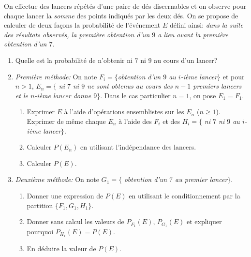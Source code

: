 \documentclass[a4paper,12pt,reqno]{amsart}
\begin{document}
\begin{exo}

  On effectue des lancers répétés d'une paire de dés discernables et on observe pour
  chaque lancer la \emph{somme} des points indiqués par les deux dés. On se
  propose de calculer de deux façons la probabilité de l'événement $E$ défini
  ainsi: \emph{dans la suite des résultats observés, la première obtention d'un
  $9$ a lieu avant la première obtention d'un $7$.}

  \begin{enumerate}
    \item  Quelle est la probabilité de n'obtenir ni $7$ ni $9$ au cours d'un lancer?
    \item \emph{Première méthode:} On note $F_i=\{$\emph{obtention d'un $9$ au $i$-ième lancer}$\}$ et pour $n>1$, $E_n=\{$ \emph{ni $7$ ni $9$ ne sont obtenus au cours des $n-1$ premiers lancers et le $n$-ième lancer donne $9$}$\}$. Dans le cas particulier $n=1$, on pose $E_1=F_1$.
      \begin{enumerate}
        \item Exprimer $E$ à l'aide d'opérations ensemblistes sur les $E_n$ ($n\geq 1$). Exprimer de même chaque $E_n$ à l'aide  des $F_i$ et des  $H_i=\{$ \emph{ni $7$ ni $9$ au $i$-ième lancer}$\}$.
        \item Calculer $P(E_n)$ en utilisant l'indépendance des lancers.
        \item Calculer $P(E)$.
      \end{enumerate}
    \item \emph{Deuxième méthode:}  On note $G_1=\{$ \emph{obtention d'un $7$ au premier lancer}$\}$.
      \begin{enumerate}
        \item Donner une expression de $P(E)$ en utilisant le conditionnement par la partition $\{F_1,G_1,H_1\}$.
        \item Donner sans calcul les valeurs de $P_{F_1}(E)$, $P_{G_1}(E)$ et expliquer pourquoi $P_{H_1}(E)=P(E)$.
        \item En déduire la valeur de $P(E)$.
      \end{enumerate}
  \end{enumerate}

\end{exo}
\end{document}
